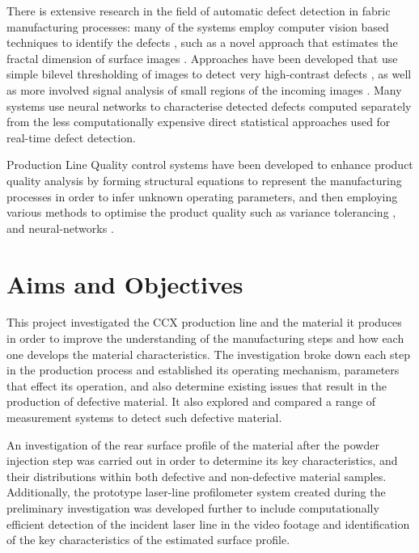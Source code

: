 \documentclass[12pt]{report}
\begin{document}
        There is extensive research in the field of automatic defect detection in fabric manufacturing processes: many of the systems employ computer vision based techniques to identify the defects \cite{kumar2008computer}, such as a novel approach that estimates the fractal dimension of surface images \cite{conci1998fractal}. Approaches have been developed that use simple bilevel thresholding of images to detect very high-contrast defects \cite{stojanovic2001real}\cite{norton1993machine}, as well as more involved signal analysis of small regions of the incoming images \cite{zhang1995fabric}\cite{huart1994integration}\cite{abou2008line}. Many systems use neural networks to characterise detected defects \cite{stojanovic2001real}\cite{wong2009stitching}\cite{karayiannis1999defect} computed separately from the less computationally expensive direct statistical approaches used for real-time defect detection.
        
        Production Line Quality control systems have been developed to enhance product quality analysis by forming structural equations to represent the manufacturing processes in order to infer unknown operating parameters, and then employing various methods to optimise the product quality such as variance tolerancing \cite{suh2007dynamic},\cite{koo2001variance} and neural-networks \cite{ohshima2000quality}.
        
    \section{Aims and Objectives}
        This project investigated the CCX production line and the material it produces in order to improve the understanding of the manufacturing steps and how each one develops the material characteristics. The investigation broke down each step in the production process and established its operating mechanism, parameters that effect its operation, and also determine existing issues that result in the production of defective material. It also explored and compared a range of measurement systems to detect such defective material.
        
        An investigation of the rear surface profile of the material after the powder injection step was carried out in order to determine its key characteristics, and their distributions within both defective and non-defective material samples. Additionally, the prototype laser-line profilometer system created during the preliminary investigation was developed further to include computationally efficient detection of the incident laser line in the video footage and identification of the key characteristics of the estimated surface profile.
        
\end{document}
